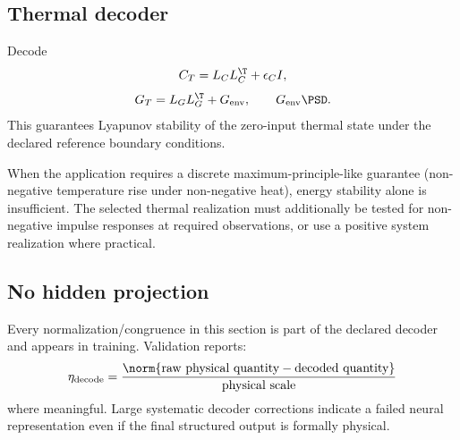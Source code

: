 \subsection{Thermal decoder}

Decode
\[
 C_T=L_CL_C^\T+\epsilon_CI,
\]
\[
 G_T=L_GL_G^\T+G_{\rm env},
 \qquad G_{\rm env}\PSD.
\]
This guarantees Lyapunov stability of the zero-input thermal state under the
declared reference boundary conditions.

When the application requires a discrete maximum-principle-like guarantee
(non-negative temperature rise under non-negative heat), energy stability alone
is insufficient. The selected thermal realization must additionally be tested
for non-negative impulse responses at required observations, or use a positive
system realization where practical.

\subsection{No hidden projection}

Every normalization/congruence in this section is part of the declared decoder
and appears in training. Validation reports:
\[
 \eta_{\rm decode}
 =
 \frac{\norm{\text{raw physical quantity}-\text{decoded quantity}}}
      {\text{physical scale}}
\]
where meaningful. Large systematic decoder corrections indicate a failed neural
representation even if the final structured output is formally physical.

